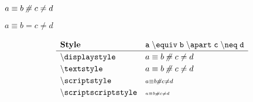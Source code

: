 \documentclass[varwidth, border = 3pt]{standalone}
\newcommand{\test}%
           {a \equiv b \apart c \neq d}
\newcommand{\verbtest}%
           {a \mathmacro{equiv} b \mathmacro{apart} c \mathmacro{neq} d}
\newcommand{\testmathstyle}{
  \[
    \renewcommand{\arraystretch}{1.2}%
    \begin{array}{lll}
        \textbf{Style}
      & \mathtt{\verbtest}
      \\ \hline
        \mathtt{\backslash displaystyle}
      & \displaystyle \test
      \\
        \mathtt{\backslash textstyle}
      & \textstyle \test
      \\
        \mathtt{\backslash scriptstyle}
      & \scriptstyle \test
      \\
        \mathtt{\backslash scriptscriptstyle}
      & \scriptscriptstyle \test
    \end{array}
  \]
}
\begin{document}
$\test$

$a \equiv b = c \neq d$

\testmathstyle
\end{document}
